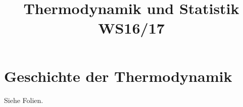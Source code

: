 
\title{Thermodynamik und Statistik WS16/17}



\maketitle
\tableofcontents
\newpage

\section{Geschichte der Thermodynamik}
Siehe Folien.











